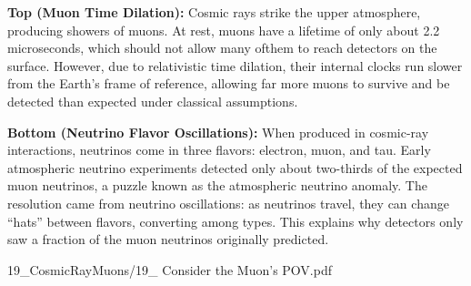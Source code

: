 \begin{SideNotePage}{

    \textbf{Top (Muon Time Dilation):} Cosmic rays strike the upper atmosphere, producing showers of muons. At rest, muons have a lifetime of only about 2.2 microseconds, which should not allow many ofthem to reach detectors on the surface. However, due to relativistic time dilation, their internal clocks run slower from the Earth’s frame of reference, allowing far more muons to survive and be detected than expected under classical assumptions. \par
    \textbf{Bottom (Neutrino Flavor Oscillations):} When produced in cosmic-ray interactions, neutrinos come in three flavors: electron, muon, and tau. Early atmospheric neutrino experiments detected only about two-thirds of the expected muon neutrinos, a puzzle known as the atmospheric neutrino anomaly. The resolution came from neutrino oscillations: as neutrinos travel, they can change “hats” between flavors, converting among types. This explains why detectors only saw a fraction of the muon neutrinos originally predicted. \par

}{19_CosmicRayMuons/19_ Consider the Muon’s POV.pdf}
\end{SideNotePage}

